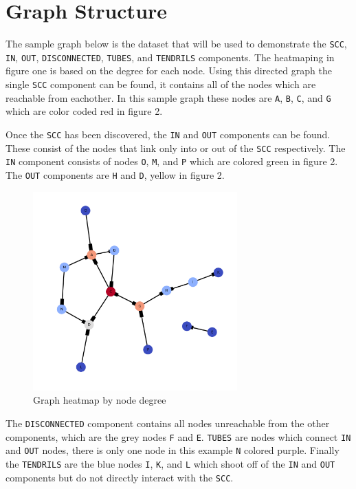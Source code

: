 \documentclass[12pt, a4paper]{article}
\newcommand{\code}[1]{\texttt{#1}}
\begin{document}
\vspace{2em}

\newpage
\section{Graph Structure}

The sample graph below is the dataset that will be used to demonstrate the
\code{SCC}, \code{IN}, \code{OUT}, \code{DISCONNECTED}, \code{TUBES}, and
\code{TENDRILS} components. The heatmaping in figure one is based on the
degree for each node. Using this directed graph the single \code{SCC}
component can be found, it contains all of the nodes which are reachable
from eachother. In this sample graph these nodes are \code{A},
\code{B}, \code{C}, and \code{G} which are color coded red in figure 2.

Once the \code{SCC} has been discovered, the \code{IN} and \code{OUT} components
can be found. These consist of the nodes that link only into or out of the
\code{SCC} respectively. The \code{IN} component consists of nodes
\code{O}, \code{M}, and \code{P} which are colored green in figure 2.
The \code{OUT} components are \code{H} and \code{D}, yellow in figure 2.

\begin{figure}[h]
    \centering
    \caption{Graph heatmap by node degree}
    \includegraphics[width=0.70\textwidth]{dia/graph_heatmap.png}
\end{figure}

\newpage
The \code{DISCONNECTED} component contains all nodes unreachable from
the other components, which are the grey nodes \code{F} and \code{E}.
\code{TUBES} are nodes which connect \code{IN} and \code{OUT} nodes,
there is only one node in this example \code{N} colored purple.
Finally the \code{TENDRILS} are the blue nodes \code{I}, \code{K},
and \code{L} which shoot off of the \code{IN} and \code{OUT}
components but do not directly interact with the \code{SCC}.
\end{document}
